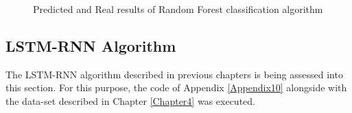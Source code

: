 \begin{figure}[H]
	\centering
	\qquad
	\caption{
		Predicted and Real results of Random Forest classification algorithm
	}
	\label{random_forest}
\end{figure}

\subsection{LSTM-RNN Algorithm}

The LSTM-RNN algorithm described in previous chapters is being assessed into this section. For this purpose, the code of Appendix \ref{Appendix10} alongside with the data-set described in Chapter \ref{Chapter4} was executed.

